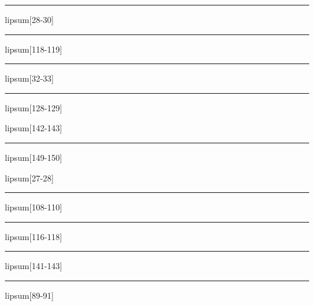 \documentclass[11pt,a4paper]{article}
\begin{document}
\begin{simplewrap}
  \textcolor{orange!12}{\rule{5.7cm}{5.9cm}}
\end{simplewrap}
lipsum[28-30]

\begin{simplewrap}
  \textcolor{yellow!22}{\rule{3.4cm}{8.8cm}}
\end{simplewrap}
lipsum[118-119]

\begin{simplewrap}
  \textcolor{yellow!55}{\rule{4.0cm}{8.1cm}}
\end{simplewrap}
lipsum[32-33]

\begin{simplewrap}
  \textcolor{blue!39}{\rule{5.0cm}{9.6cm}}
\end{simplewrap}
lipsum[128-129]

lipsum[142-143]

\begin{simplewrap}
  \textcolor{olive!47}{\rule{4.4cm}{6.1cm}}
\end{simplewrap}
lipsum[149-150]

lipsum[27-28]

\begin{simplewrap}
  \textcolor{pink!52}{\rule{4.8cm}{9.1cm}}
\end{simplewrap}
lipsum[108-110]

\begin{simplewrap}
  \textcolor{magenta!27}{\rule{4.2cm}{4.7cm}}
\end{simplewrap}
lipsum[116-118]

\begin{simplewrap}
  \textcolor{purple!36}{\rule{4.8cm}{9.1cm}}
\end{simplewrap}
lipsum[141-143]

\begin{simplewrap}
  \textcolor{magenta!50}{\rule{3.7cm}{3.7cm}}
\end{simplewrap}
lipsum[89-91]
\end{document}
